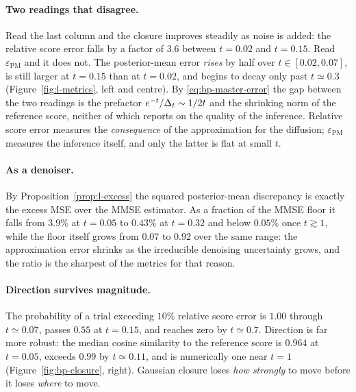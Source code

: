 \paragraph{Two readings that disagree.}
Read the last column and the closure improves steadily as noise is added: the
relative score error falls by a factor of $3.6$ between $t=0.02$ and $t=0.15$.
Read $\varepsilon_{\mathrm{PM}}$ and it does not. The posterior-mean error
\emph{rises} by half over $t\in[0.02,0.07]$, is still larger at $t=0.15$ than
at $t=0.02$, and begins to decay only past $t\simeq0.3$
(Figure~\ref{fig:l-metrics}, left and centre). By \eqref{eq:bp-master-error}
the gap between the two readings is the prefactor $e^{-t}/\Delta_t\sim1/2t$ and
the shrinking norm of the reference score, neither of which reports on the
quality of the inference. Relative score error measures the \emph{consequence}
of the approximation for the diffusion; $\varepsilon_{\mathrm{PM}}$ measures
the inference itself, and only the latter is flat at small $t$.

\paragraph{As a denoiser.}
By Proposition~\ref{prop:l-excess} the squared posterior-mean discrepancy is
exactly the excess MSE over the MMSE estimator. As a fraction of the MMSE
floor it falls from $3.9\%$ at $t=0.05$ to $0.43\%$ at $t=0.32$ and below
$0.05\%$ once $t\gtrsim1$, while the floor itself grows from $0.07$ to $0.92$
over the same range: the approximation error shrinks as the irreducible
denoising uncertainty grows, and the ratio is the sharpest of the metrics for
that reason.

\paragraph{Direction survives magnitude.}
The probability of a trial exceeding $10\%$ relative score error is $1.00$
through $t\simeq0.07$, passes $0.55$ at $t=0.15$, and reaches zero by
$t\simeq0.7$. Direction is far more robust: the median cosine similarity to
the reference score is $0.964$ at $t=0.05$, exceeds $0.99$ by $t\simeq0.11$,
and is numerically one near $t=1$ (Figure~\ref{fig:bp-closure}, right).
Gaussian closure loses \emph{how strongly} to move before it loses
\emph{where} to move.

